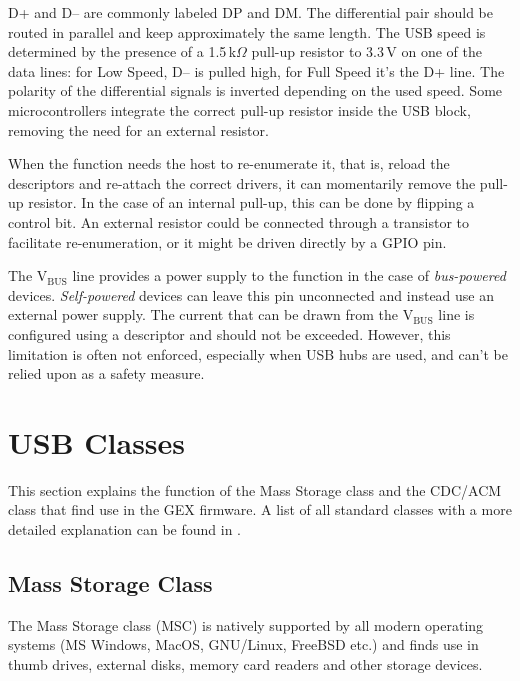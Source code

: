D+ and D-- are commonly labeled DP and DM. The differential pair should be routed in parallel and keep approximately the same length. The USB speed is determined by the presence of a 1.5\,k$\Omega$ pull-up resistor to 3.3\,V on one of the data lines: for Low Speed, D-- is pulled high, for Full Speed it's the D+ line. The polarity of the differential signals is inverted depending on the used speed. Some microcontrollers integrate the correct pull-up resistor inside the USB block, removing the need for an external resistor.

When the function needs the host to re-enumerate it, that is, reload the descriptors and re-attach the correct drivers, it can momentarily remove the pull-up resistor. In the case of an internal pull-up, this can be done by flipping a control bit. An external resistor could be connected through a transistor to facilitate re-enumeration, or it might be driven directly by a GPIO pin.


The V$_\mathrm{BUS}$ line provides a power supply to the function in the case of \textit{bus-powered} devices. \textit{Self-powered} devices can leave this pin unconnected and instead use an external power supply. The current that can be drawn from the V$_\mathrm{BUS}$ line is configured using a descriptor and should not be exceeded. However, this limitation is often not enforced, especially when USB hubs are used, and can't be relied upon as a safety measure.

\section{USB Classes}

This section explains the function of the Mass Storage class and the CDC/ACM class that find use in the GEX firmware. A list of all standard classes with a more detailed explanation can be found in .

\subsection{Mass Storage Class}

The Mass Storage class (MSC) is natively supported by all modern operating systems (MS Windows, MacOS, GNU/Linux, FreeBSD etc.) and finds use in thumb drives, external disks, memory card readers and other storage devices. 

